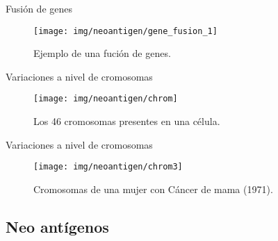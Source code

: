 \documentclass[10pt]{beamer}
\newcommand{\1}{
	\setbeamertemplate{background}{
		\texttt{[image: img/1]}
		\tikz[overlay] \fill[fill opacity=0.75,fill=white] (0,0) rectangle (-\paperwidth,\paperheight);
	}
}
\begin{document}
\begin{frame}{Fusión de genes}{}
	\begin{figure}[h]
		\centering
		\texttt{[image: img/neoantigen/gene\_fusion\_1]}
		\caption{Ejemplo de una fución de genes.}
		\label{fig:cnv}
	\end{figure}	
\end{frame}


\begin{frame}{Variaciones a nivel de cromosomas}{}
	\begin{figure}
		\centering
		\texttt{[image: img/neoantigen/chrom]}
		\caption{Los 46 cromosomas presentes en una célula.}
	\end{figure}		
\end{frame}

\begin{frame}{Variaciones a nivel de cromosomas}{}
	\begin{figure}
		\centering
		\texttt{[image: img/neoantigen/chrom3]}
		\caption{Cromosomas de una mujer con Cáncer de mama (1971).}
	\end{figure}		
\end{frame}

\subsection{Neo antígenos}
\end{document}
